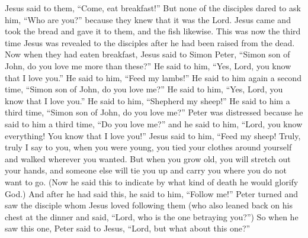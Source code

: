 \begin{biblechapter}
\verse Jesus said to them, “Come, eat breakfast!” But none of the disciples dared to ask him, “Who are you?” because they knew that it was the Lord.
\verse Jesus came and took the bread and gave it to them, and the fish likewise.
\verse This was now the third time Jesus was revealed to the disciples after he had been raised from the dead.
 Now when they had eaten breakfast, Jesus said to Simon Peter, “Simon son of John, do you love me more than these?” He said to him, “Yes, Lord, you know that I love you.” He said to him, “Feed my lambs!”
\verse He said to him again a second time, “Simon son of John, do you love me?” He said to him, “Yes, Lord, you know that I love you.” He said to him, “Shepherd my sheep!”
\verse He said to him a third time, “Simon son of John, do you love me?” Peter was distressed because he said to him a third time, “Do you love me?” and he said to him, “Lord, you know everything! You know that I love you!” Jesus said to him, “Feed my sheep!
\verse Truly, truly I say to you, when you were young, you tied your clothes around yourself and walked wherever you wanted. But when you grow old, you will stretch out your hands, and someone else will tie you up and carry you where you do not want to go.
\verse (Now he said this to indicate by what kind of death he would glorify God.) And after he had said this, he said to him, “Follow me!”
 Peter turned and saw the disciple whom Jesus loved following them (who also leaned back on his chest at the dinner and said, “Lord, who is the one betraying you?”)
\verse So when he saw this one, Peter said to Jesus, “Lord, but what about this one?”

\end{biblechapter}
